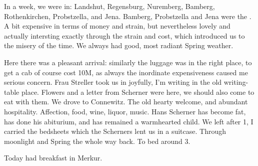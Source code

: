 \documentclass{article}
\begin{document}
In a week, we were in: Landshut, Regensburg, Nuremberg, Bamberg, Rothenkirchen, Probstzella, and Jena. Bamberg, Probstzella and Jena were the . A bit expensive in terms of money and strain, but nevertheless lovely and actually intersting exactly through the strain and cost, which introduced us to the misery of the time. We always had good, most radiant Spring weather.

Here there was a pleasant arrival: similarly the luggage was in the right place, to get a cab of course cost 10M, as always the inordinate expensiveness caused me serious concern. Frau Streller took us in joyfully, I'm writing in the old writing-table place. Flowers and a letter from Scherner were here, we should also come to eat with them. We drove to Connewitz. The old hearty welcome, and abundant hospitality. Affection, food, wine, liquor, music. Hans Scherner has become fat, has done his abiturium, and has remained a warmhearted child. We left after 1, I carried the bedsheets which the Scherners lent us in a suitcase. Through moonlight and Spring the whole way back. To bed around 3.

Today had breakfast in Merkur.
\end{document}
